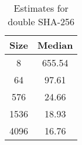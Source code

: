 \begin{table}
  \centering
  \begin{tabular}{ | c | c | }
    \hline
    \textbf{Size} & \textbf{Median} \\ \hline
    8    & 655.54 \\ \hline
    64   & 97.61 \\ \hline
    576  & 24.66 \\ \hline
    1536 & 18.93 \\ \hline
    4096 & 16.76 \\ \hline
  \end{tabular}
  \caption{Estimates for double SHA-256}
  \label{tbl:supercop:sha256d}
\end{table}
